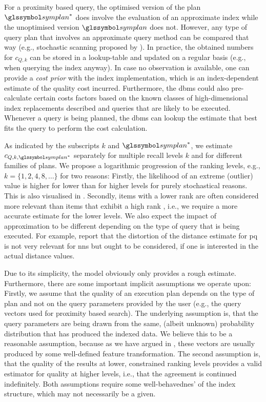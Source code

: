 For a proximity based query, the optimised version of the plan $\symplan^{*}$ does involve the evaluation of an approximate index while the unoptimised version $\symplan$ does not. However, any type of query plan that involves an approximate query method can be compared that way (e.g., stochastic scanning proposed by \cite{Giangreco:2018Database}). In practice, the obtained numbers for $c_{Q,k}$ can be stored in a lookup-table and updated on a regular basis (e.g., when querying the index anyway). In case no observation is available, one can provide a \emph{cost prior} with the index implementation, which is an index-dependent estimate of the quality cost incurred. Furthermore, the \acrshort{dbms} could also pre-calculate certain costs factors based on the known classes of high-dimensional index replacements described  and queries that are likely to be executed. Whenever a query is being planned, the \acrshort{dbms} can lookup the estimate that best fits the query to perform the cost calculation.

As indicated by the subscripts $k$ and $\symplan^{*}$, we estimate $c_{Q,k,\symplan^{*}}$ separately for multiple recall levels $k$ and for different families of plans. We propose a logarithmic progression of the ranking levels, e.g., $k= \{ 1, 2, 4, 8, \ldots \}$ for two reasons: Firstly, the likelihood of an extreme (outlier) value is higher for lower than for higher levels for purely stochastical reasons. This is also visualised in . Secondly, items with a lower rank are often considered more relevant than items that exhibit a high rank \cite{Jarvelin:2002Cumulated}, i.e., we require a more accurate estimate for the lower levels. We also expect the impact of approximation to be different depending on the type of query that is being executed. For example, \cite{Jegou:2010Product} report that the distortion of the distance estimate for \acrshort{pq} is not very relevant for \acrshort{nns} but ought to be considered, if one is interested in the actual distance values.

Due to its simplicity, the model obviously only provides a rough estimate. Furthermore, there are some important implicit assumptions we operate upon: Firstly, we assume that the quality of an execution plan depends on the type of plan and not on the query parameters provided by the user (e.g., the query vectors used for proximity based search). The underlying assumption is, that the query parameters are being drawn from the same, (albeit unknown) probability distribution that has produced the indexed data. We believe this to be a reasonable assumption, because as we have argued in , these vectors are usually produced by some well-defined feature transformation. The second assumption is, that the quality of the results at lower, constrained ranking levels provides a valid estimator for quality at higher levels, i.e., that the agreement is continued indefinitely. Both assumptions require some well-behavednes' of the index structure, which may not necessarily be a given.

